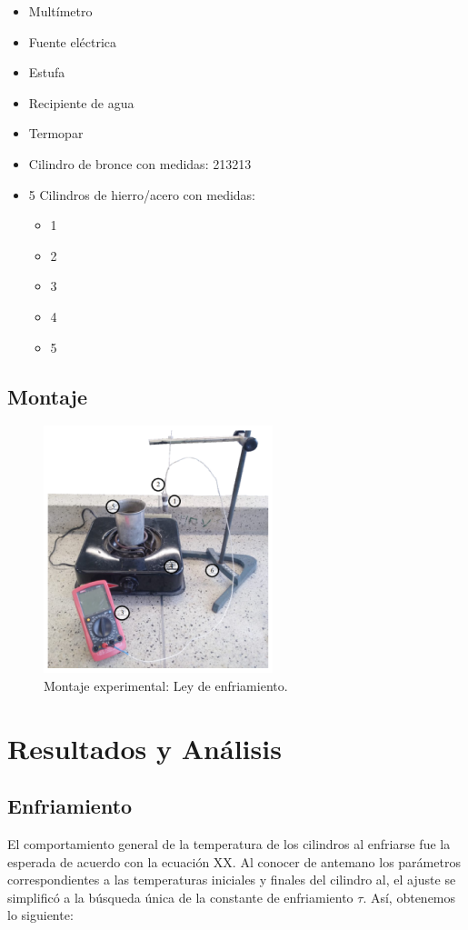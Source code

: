 \documentclass{article}
\begin{document}
\begin{multicols}{2}
\begin{itemize}
    \item Multímetro
    \item Fuente eléctrica 
    \item Estufa
    \item Recipiente de agua
    \item Termopar
    \item Cilindro de bronce con medidas:
        213213
    \item 5 Cilindros de hierro/acero con medidas: 
        \begin{itemize}
        \item 1
        \item 2
        \item 3
        \item 4
        \item 5
        \end{itemize}
\end{itemize}
\end{multicols}

\subsection{Montaje}

\begin{figure}[H]
    \centering
    \includegraphics{media/Montaje.png}
    \caption{Montaje experimental: Ley de enfriamiento.}
    
\end{figure}


\section{Resultados y Análisis}
\subsection{Enfriamiento}
El comportamiento general de la temperatura de los cilindros al enfriarse fue la esperada de acuerdo con la ecuación XX. Al conocer de antemano los parámetros correspondientes a las temperaturas iniciales y finales del cilindro al, el ajuste se simplificó a la búsqueda única de la constante de enfriamiento $\tau$. Así, obtenemos lo siguiente:
\end{document}
